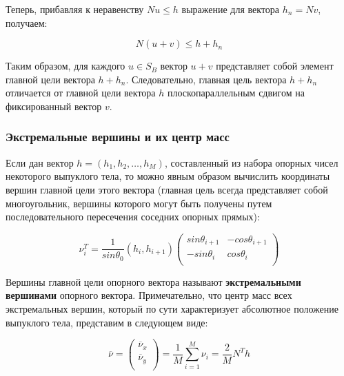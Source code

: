 \documentclass[a4paper, 12pt, titlepage]{article}
\theoremstyle{definition}
\theoremstyle{plain}
\theoremstyle{plain}
\begin{document}
Теперь, прибавляя к неравенству $N u \leq h$ выражение для вектора
$h_{n} = N v$, получаем:
  
\begin{equation}
N (u + v) \leq h + h_{n}
\end{equation}

Таким образом, для каждого $u \in S_{B}$ вектор $u + v$ представляет собой
элемент главной цели вектора $h + h_{n}$. Следовательно, главная цель вектора
$h + h_{n}$ отличается от главной цели вектора $h$ плоскопараллельным сдвигом на
фиксированный вектор $v$.

\subsubsection{Экстремальные вершины и их центр масс}
\label{sec:history/PrinceW90/extreme-points}

Если дан вектор $h = (h_{1}, h_{2}, \ldots, h_{M})$, составленный из набора
опорных чисел некоторого выпуклого тела, то можно явным образом вычислить
координаты вершин главной цели этого вектора (главная цель всегда представляет
собой многоугольник, вершины которого могут быть получены путем
последовательного пересечения соседних опорных прямых):

\begin{equation}
\nu_{i}^{T} = \frac{1}{sin \theta_{0}} (h_{i},  h_{i + 1})
\left(
  \begin{array}{cc}
    sin \theta_{i + 1} & - cos \theta_{i + 1} \\
    - sin \theta_{i} & cos \theta_{i} \\
  \end{array}
\right)
\end{equation}

Вершины главной цели опорного вектора называют \textbf{экстремальными вершинами}
опорного вектора. Примечательно, что центр масс всех экстремальных вершин,
который по сути характеризует абсолютное положение выпуклого тела, представим
в следующем виде:

\begin{equation}
\overline{\nu} = \left(
  \begin{array}{c}
   \overline{\nu}_{x} \\
   \overline{\nu}_{y} \\
  \end{array}
  \right) =
  \frac{1}{M} \sum\limits_{i = 1}^{M} \nu_{i} = \frac{2}{M} N^{T} h
\end{equation}
\end{document}
